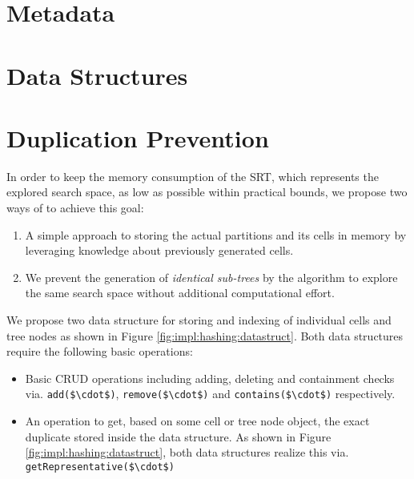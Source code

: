	\section{Metadata}
	\label{chap:impl:meta}
	
	\section{Data Structures}
	\label{chap:impl:structures}
	
		\clearpage
	
	\section{Duplication Prevention}
	\label{chap:impl:hashing}
	
		In order to keep the memory consumption of the \ac{SRT}, which represents the explored search space, as low as possible within practical bounds, we propose two ways of to achieve this goal:
		
		\begin{enumerate}
			\item A simple approach to storing the actual partitions and its cells in memory by leveraging knowledge about previously generated cells.
			\item We prevent the generation of \textit{identical sub-trees} by the algorithm to explore the same search space without additional computational effort.
		\end{enumerate}
		
		We propose two data structure for storing and indexing of individual cells and tree nodes as shown in Figure \ref{fig:impl:hashing:datastruct}.
		Both data structures require the following basic operations:
		
		\begin{itemize}
			\item Basic \ac{CRUD} operations including adding, deleting and containment checks via. \lstinline[mathescape]|add($\cdot$)|, \lstinline[mathescape]|remove($\cdot$)| and \lstinline[mathescape]|contains($\cdot$)| respectively.
			\item An operation to get, based on some cell or tree node object, the exact duplicate stored inside the data structure. As shown in Figure \ref{fig:impl:hashing:datastruct}, both data structures realize this via. \lstinline[mathescape]|getRepresentative($\cdot$)|
		\end{itemize}
		
